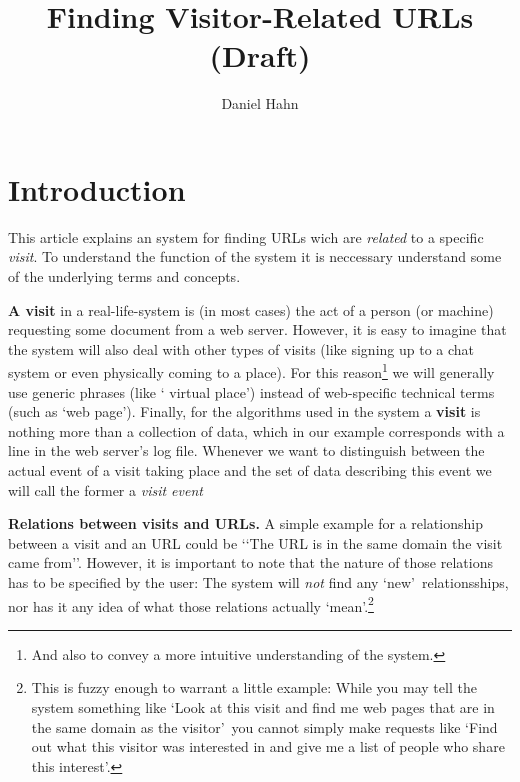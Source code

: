 \documentclass[a4paper]{danarticle}
\begin{document}
  \author{Daniel Hahn}
  \title{Finding Visitor-Related URLs (Draft)}
  \maketitle
  
  \section*{Introduction}
    This article explains an system for finding URLs wich are
    \textit{related} to a specific \textit{visit}. To understand the
    function of the system it is neccessary understand
    some of the underlying terms and concepts.
    
    \textbf{A visit} in a real-life-system is (in most cases) the
    act of a person (or machine) requesting some document from a
    web server. However, it is easy to imagine that the system will
    also deal with other types of visits (like signing up to a
    chat system or even physically coming to a place). For this
    reason\footnote{And also to convey a more intuitive understanding
    of the system.} we will generally use generic phrases (like \lq 
    virtual place\rq ) instead of web-specific technical terms (such
    as \lq web page\rq ). Finally, for the algorithms used in the
    system a \textbf{visit} is nothing more than a collection of
    data, which in our example corresponds with a line in the web
    server's log file. Whenever we want to distinguish between the
    actual event of a visit taking place and the set of data
    describing this event we will call the former a \textit{visit event}
    
    \textbf{Relations between visits and URLs.} A simple example
    for a relationship between a visit and an URL could be
    \lq\lq The URL is in the same domain the visit came from\rq\rq .
    However, it is important to note that the nature of those 
    relations has to be specified by the user: The system will 
    \textit{not} find any \lq new\rq\ relationsships, nor has it 
    any idea of what those relations actually \lq mean\rq .\footnote{This
    is fuzzy enough to warrant a little example: While you may tell the
    system something like \lq Look at this visit and find me web 
    pages that are in the same domain as the visitor\rq\ you cannot
    simply make requests like \lq Find out what this visitor was 
    interested in and give me a list of people who share this
    interest\rq .} 
    
\end{document}
